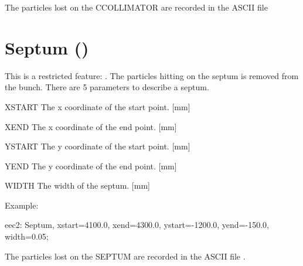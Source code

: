 The particles lost on the CCOLLIMATOR are recorded in the ASCII file 

\clearpage
\section{Septum (\opalcycl)}
This is a restricted feature: \noopalt.
The particles hitting on the septum is removed from the bunch. There are 5 parameters to describe a septum.
\begin{kdescription}
\item[XSTART]
The x coordinate of the start point. [\si{\milli\meter}]
 \item[XEND]
The x coordinate of the end point. [\si{\milli\meter}]
\item[YSTART]
The y coordinate of the start point. [\si{\milli\meter}]
 \item[YEND]
The y coordinate of the end point. [\si{\milli\meter}]
\item[WIDTH]
The width of the septum. [\si{\milli\meter}]
\end{kdescription}


\noindent Example:
\begin{example}
eec2: Septum, xstart=4100.0, xend=4300.0,
ystart=-1200.0, yend=-150.0, width=0.05;
\end{example}

The particles lost on the SEPTUM are recorded in the ASCII file .

\clearpage

